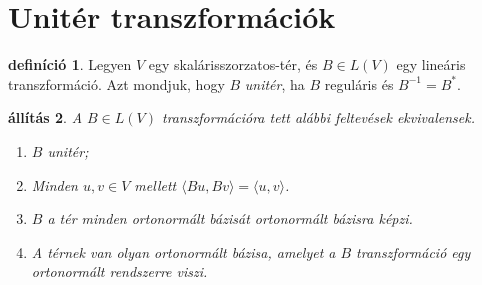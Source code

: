 \documentclass[a4paper, showtrims]{memoir}
\theoremstyle{plain}
\newtheorem{proposition}{állítás}[chapter]
\theoremstyle{remark}
\theoremstyle{definition}
\newtheorem{definition}[proposition]{definíció}
\newcommand{\ip}[2]{\langle#1,#2\rangle}
\begin{document}
\section{Unitér transzformációk}
\begin{definition}
	Legyen $V$ egy skalárisszorzatos-tér, és $B\in L\left( V \right)$ egy lineáris transzformáció.
	Azt mondjuk, hogy $B$
	\emph{unitér},
	ha $B$ reguláris és $B^{-1}=B^\ast$.
\end{definition}
\begin{proposition}
	A $B\in L\left( V \right)$ transzformációra tett alábbi feltevések ekvivalensek.
	\begin{enumerate}
		\item $B$ unitér;
		\item Minden $u,v\in V$ mellett $\ip{Bu}{Bv}=\ip{u}{v}$.
		\item $B$ a tér minden ortonormált bázisát ortonormált bázisra képzi.
		\item A térnek van olyan ortonormált bázisa, 
            amelyet a $B$ transzformáció egy ortonormált rendszerre viszi. 
		      \qedhere
	\end{enumerate}
\end{proposition}
\end{document}
